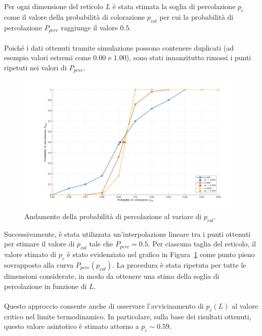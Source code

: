\vspace{15px}
\noindent
Per ogni dimensione del reticolo $L$ è stata stimata la soglia di percolazione $p_c$ come il valore della probabilità di colorazione $p_{col}$ per cui la probabilità di percolazione $P_{perc}$ raggiunge il valore $0.5$.
\\\\
\noindent
Poiché i dati ottenuti tramite simulazione possono contenere duplicati (ad esempio valori estremi come $0.00$ e $1.00$), sono stati innanzitutto rimossi i punti ripetuti nei valori di $P_{perc}$.

\begin{figure}[H]
	\centering
	\includegraphics[width=\linewidth]{images/percolation_threshold.png}
	\caption{Andamento della probabilità di percolazione al variare di $p_{col}$.}
	\label{fig:perc_thr}
\end{figure}

\noindent
Successivamente, è stata utilizzata un’interpolazione lineare tra i punti ottenuti per stimare il valore di $p_{col}$ tale che $P_{perc} = 0.5$. Per ciascuna taglia del reticolo, il valore stimato di $p_c$ è stato evidenziato nel grafico in Figura~\ref{fig:perc_thr} come punto pieno sovrapposto alla curva $P_{perc}(p_{col})$. La procedura è stata ripetuta per tutte le dimensioni considerate, in modo da ottenere una stima della soglia di percolazione in funzione di $L$.
\\\\
\noindent
Questo approccio consente anche di osservare l’avvicinamento di $p_c(L)$ al valore critico nel limite termodinamico. In particolare, sulla base dei risultati ottenuti, questo valore asintotico è stimato attorno a $p_c \sim 0.59$.

